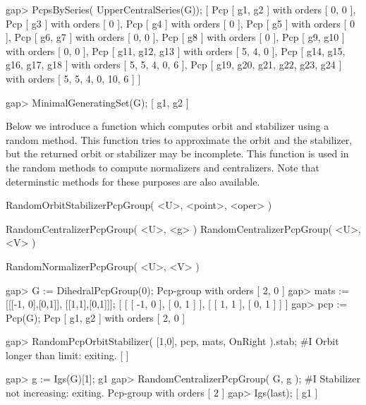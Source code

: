 gap> PcpsBySeries( UpperCentralSeries(G));
[ Pcp [ g1, g2 ] with orders [ 0, 0 ],
  Pcp [ g3 ] with orders [ 0 ],
  Pcp [ g4 ] with orders [ 0 ],
  Pcp [ g5 ] with orders [ 0 ],
  Pcp [ g6, g7 ] with orders [ 0, 0 ],
  Pcp [ g8 ] with orders [ 0 ],
  Pcp [ g9, g10 ] with orders [ 0, 0 ],
  Pcp [ g11, g12, g13 ] with orders [ 5, 4, 0 ],
  Pcp [ g14, g15, g16, g17, g18 ] with orders [ 5, 5, 4, 0, 6 ],
  Pcp [ g19, g20, g21, g22, g23, g24 ] with orders [ 5, 5, 4, 0, 10, 6 ] ]

gap> MinimalGeneratingSet(G);
[ g1, g2 ]
\endexample



Below we introduce a function which computes orbit and stabilizer using 
a random method. This function tries to approximate the orbit and the 
stabilizer, but the returned orbit or stabilizer may be incomplete. 
This function is used in the random methods to compute normalizers and 
centralizers. Note that determinstic methods for these purposes are also
available.

\> RandomOrbitStabilizerPcpGroup( <U>, <point>, <oper> )

\> RandomCentralizerPcpGroup( <U>, <g> )
\> RandomCentralizerPcpGroup( <U>, <V> )

\> RandomNormalizerPcpGroup( <U>, <V> )

\beginexample
gap> G := DihedralPcpGroup(0);
Pcp-group with orders [ 2, 0 ]
gap> mats := [[[-1, 0],[0,1]], [[1,1],[0,1]]];
[ [ [ -1, 0 ], [ 0, 1 ] ], [ [ 1, 1 ], [ 0, 1 ] ] ]
gap> pcp := Pcp(G);
Pcp [ g1, g2 ] with orders [ 2, 0 ]

gap> RandomPcpOrbitStabilizer( [1,0], pcp, mats, OnRight ).stab;
#I  Orbit longer than limit: exiting.
[  ]

gap> g := Igs(G)[1];
g1
gap> RandomCentralizerPcpGroup( G, g );
#I  Stabilizer not increasing: exiting.
Pcp-group with orders [ 2 ]
gap> Igs(last);
[ g1 ]
\endexample

